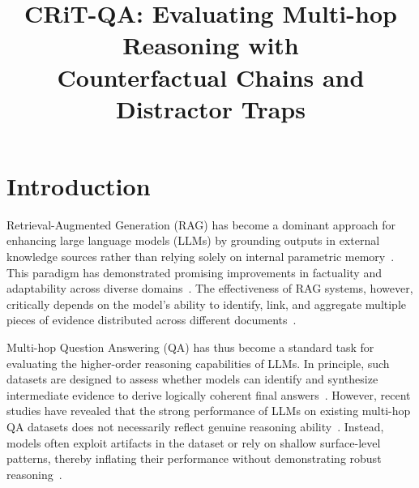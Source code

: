\documentclass[10pt, a4paper]{article}
\title{CRiT-QA: Evaluating Multi-hop Reasoning with \\ Counterfactual Chains and Distractor Traps}
\begin{document}
\maketitleabstract

\section{Introduction}

Retrieval-Augmented Generation (RAG) has become a dominant approach for enhancing large language models (LLMs) by grounding outputs in external knowledge sources rather than relying solely on internal parametric memory~\cite{lewis2020retrieval, fan2024survey}. This paradigm has demonstrated promising improvements in factuality and adaptability across diverse domains~\cite{tang2024multihop, gao2024retrievalaugmentedgenerationlargelanguage}. The effectiveness of RAG systems, however, critically depends on the model's ability to identify, link, and aggregate multiple pieces of evidence distributed across different documents~\cite{fang-etal-2024-trace, suryawanshi2025knowledge}. 

Multi-hop Question Answering (QA) has thus become a standard task for evaluating the higher-order reasoning capabilities of LLMs. In principle, such datasets are designed to assess whether models can identify and synthesize intermediate evidence to derive logically coherent final answers~\cite{kim-etal-2024-improving-multi, li2024meqa, liu2025hopragmultihopreasoninglogicaware}. However, recent studies have revealed that the strong performance of LLMs on existing multi-hop QA datasets does not necessarily reflect genuine reasoning ability~\cite{wu2024mrke, jiang-etal-2024-peek, parmar-etal-2024-logicbench}. Instead, models often exploit artifacts in the dataset or rely on shallow surface-level patterns, thereby inflating their performance without demonstrating robust reasoning~\cite{schlegel-etal-2020-framework, trivedi-etal-2022-musique, suryawanshi2025knowledge}.
\end{document}
